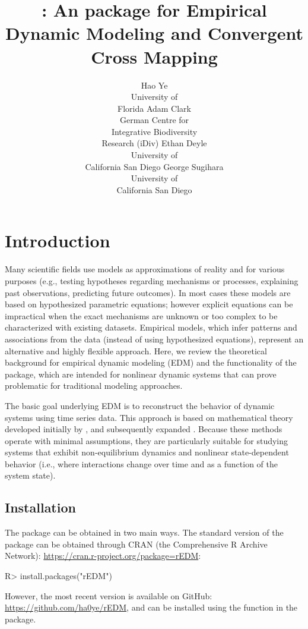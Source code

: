 \documentclass[article]{jss}
\author{Hao Ye\\University of \\Florida
   \And Adam Clark\\German Centre for \\Integrative Biodiversity \\Research (iDiv)
   \And Ethan Deyle\\University of \\California San Diego
   \And George Sugihara\\University of \\California San Diego}
\title{\pkg{rEDM}: An \proglang{R} package for Empirical Dynamic Modeling and Convergent Cross Mapping}
\begin{document}
\section{Introduction} \label{sec:intro}

Many scientific fields use models as approximations of reality and for various purposes (e.g., testing hypotheses regarding mechanisms or processes, explaining past observations, predicting future outcomes). In most cases these models are based on hypothesized parametric equations; however explicit equations can be impractical when the exact mechanisms are unknown or too complex to be characterized with existing datasets. Empirical models, which infer patterns and associations from the data (instead of using hypothesized equations), represent an alternative and highly flexible approach. Here, we review the theoretical background for empirical dynamic modeling (EDM) and the functionality of the  package, which are intended for nonlinear dynamic systems that can prove problematic for traditional modeling approaches.

The basic goal underlying EDM is to reconstruct the behavior of dynamic systems using time series data. This approach is based on mathematical theory developed initially by \citep{Takens_1981}, and subsequently expanded \citep{Sauer_1991, Casdagli_1991, Deyle_2011}. Because these methods operate with minimal assumptions, they are particularly suitable for studying systems that exhibit non-equilibrium dynamics and nonlinear state-dependent behavior (i.e., where interactions change over time and as a function of the system state).

\subsection{Installation}\label{sec:installation}

The  package can be obtained in two main ways. The standard version of the package can be obtained through CRAN (the Comprehensive R Archive Network): \url{https://cran.r-project.org/package=rEDM}:

\begin{Schunk}
\begin{Sinput}
R> install.packages("rEDM")
\end{Sinput}
\end{Schunk}

However, the most recent version is available on GitHub: \url{https://github.com/ha0ye/rEDM}, and can be installed using the  function in the  package.
\end{document}
